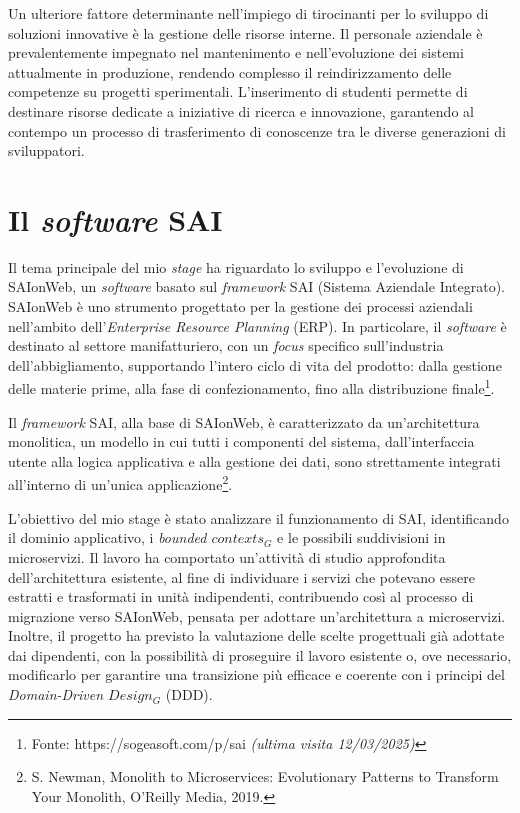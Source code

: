     \vspace{0.2 em}
    \noindent Un ulteriore fattore determinante nell’impiego di tirocinanti per lo sviluppo di soluzioni innovative è la gestione delle risorse interne. Il personale aziendale è prevalentemente impegnato nel mantenimento e nell’evoluzione dei sistemi attualmente in produzione, rendendo complesso il reindirizzamento delle competenze su progetti sperimentali. L’inserimento di studenti permette di destinare risorse dedicate a iniziative di ricerca e innovazione, garantendo al contempo un processo di trasferimento di conoscenze tra le diverse generazioni di sviluppatori.
    
    \section{Il \textit{software} SAI}
    
    Il tema principale del mio \textit{stage} ha riguardato lo sviluppo e l’evoluzione di SAIonWeb, un \textit{software} basato sul \textit{framework} SAI (Sistema Aziendale Integrato). SAIonWeb è uno strumento progettato per la gestione dei processi aziendali nell’ambito dell’\textit{Enterprise Resource Planning} (ERP). In particolare, il \textit{software} è destinato al settore manifatturiero, con un \textit{focus} specifico sull'industria dell’abbigliamento, supportando l'intero ciclo di vita del prodotto: dalla gestione delle materie prime, alla fase di confezionamento, fino alla distribuzione finale\footnote{Fonte: https://sogeasoft.com/p/sai \textit{(ultima visita 12/03/2025)}}. 

    \vspace{0.2 em}
    \noindent Il \textit{framework} SAI, alla base di SAIonWeb, è caratterizzato da un'architettura monolitica, un modello in cui tutti i componenti del sistema, dall’interfaccia utente alla logica applicativa e alla gestione dei dati, sono strettamente integrati all’interno di un'unica applicazione\footnote{S. Newman, Monolith to Microservices: Evolutionary Patterns to Transform Your Monolith, O'Reilly Media, 2019.}.  

    \vspace{0.2 em}
    \noindent L'obiettivo del mio stage è stato analizzare il funzionamento di SAI, identificando il dominio applicativo, i \textit{bounded $contexts_G$} e le possibili suddivisioni in microservizi. Il lavoro ha comportato un'attività di studio approfondita dell'architettura esistente, al fine di individuare i servizi che potevano essere estratti e trasformati in unità indipendenti, contribuendo così al processo di migrazione verso SAIonWeb, pensata per adottare un'architettura a microservizi. Inoltre, il progetto ha previsto la valutazione delle scelte progettuali già adottate dai dipendenti, con la possibilità di proseguire il lavoro esistente o, ove necessario, modificarlo per garantire una transizione più efficace e coerente con i principi del \textit{Domain-Driven $Design_G$} (DDD). 
    
